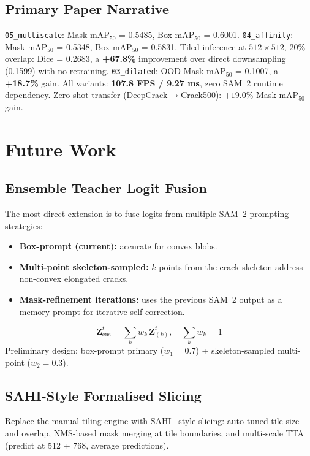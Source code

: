 \documentclass[12pt,a4paper]{article}
\begin{document}
\subsection{Primary Paper Narrative}

\texttt{05\_multiscale}: Mask mAP$_{50}$ = 0.5485, Box mAP$_{50}$ = 0.6001.
\texttt{04\_affinity}: Mask mAP$_{50}$ = 0.5348, Box mAP$_{50}$ = 0.5831.
Tiled inference at $512\times512$, 20\% overlap: Dice = 0.2683,
a \textbf{+67.8\%} improvement over direct downsampling (0.1599) with no
retraining.
\texttt{03\_dilated}: OOD Mask mAP$_{50}$ = 0.1007, a \textbf{+18.7\%} gain.
All variants: \textbf{107.8 FPS / 9.27 ms}, zero SAM~2 runtime dependency.
Zero-shot transfer (DeepCrack$\to$Crack500): $+19.0\%$ Mask mAP$_{50}$ gain.

\section{Future Work}
\label{sec:future}

\subsection{Ensemble Teacher Logit Fusion}

The most direct extension is to fuse logits from multiple SAM~2 prompting
strategies:
\begin{itemize}
  \item \textbf{Box-prompt (current):} accurate for convex blobs.
  \item \textbf{Multi-point skeleton-sampled:} $k$ points from the crack
    skeleton address non-convex elongated cracks.
  \item \textbf{Mask-refinement iterations:} uses the previous SAM~2 output as
    a memory prompt for iterative self-correction.
\end{itemize}
\[
\mathbf{Z}^t_\text{ens}=\sum_k w_k\,\mathbf{Z}^t_{(k)},\quad\sum_k w_k=1
\]
Preliminary design: box-prompt primary ($w_1=0.7$) + skeleton-sampled
multi-point ($w_2=0.3$).

\subsection{SAHI-Style Formalised Slicing}

Replace the manual tiling engine with SAHI~\cite{akyon2022sahi}-style slicing:
auto-tuned tile size and overlap, NMS-based mask merging at tile boundaries,
and multi-scale TTA (predict at 512 + 768, average predictions).
\end{document}
